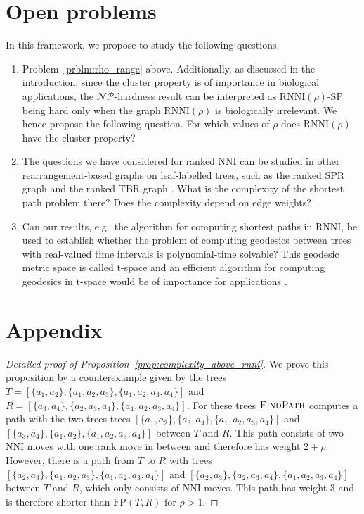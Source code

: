 \documentclass[11pt]{amsart}
\newcommand{\rnni}{\mathrm{RNNI}}
\newcommand{\findpath}{\textsc{FindPath}}
\newcommand{\nni}{\mathrm{NNI}}
\newcommand{\spr}{\mathrm{SPR}}
\newcommand{\tbr}{\mathrm{TBR}}
\newcommand{\fp}{\mathrm{FP}}
\newcommand{\np}{\mathcal{NP}}
\newcommand{\decprob}[1]{\rnni(#1)\text{-}\mathrm{SP}}
\begin{document}
\section{Open problems}

In this framework, we propose to study the following questions.
\begin{enumerate}
\item Problem~\ref{prblm:rho_range} above.
Additionally, as discussed in the introduction, since the cluster property is of importance in biological applications, the $\np$-hardness result can be interpreted as $\decprob{\rho}$ being hard only when the graph $\rnni(\rho)$ is biologically irrelevant.
We hence propose the following question.
For which values of $\rho$ does $\rnni(\rho)$ have the cluster property?


\item The questions we have considered for ranked $\nni$ can be studied in other rearrangement-based graphs on leaf-labelled trees, such as the ranked $\spr$ graph and the ranked $\tbr$ graph \autocite{Semple2003-nj}.
What is the complexity of the shortest path problem there?
Does the complexity depend on edge weights?

\item Can our results, e.g.\ the algorithm for computing shortest paths in $\rnni$, be used to establish whether the problem of computing geodesics between trees with real-valued time intervals is polynomial-time solvable?
This geodesic metric space is called $\mathrm t$-space and an efficient algorithm for computing geodesics in $\mathrm t$-space would be of importance for applications \autocite{Gavryushkin2016-uu}.
\end{enumerate}


\section*{Appendix}
\renewcommand{\figurename}{Supplementary Figure}

\begin{proof}[Detailed proof of Proposition~\ref{prop:complexity_above_rnni}]
We prove this proposition by a counterexample given by the trees \break $T = [\{a_1,a_2\},\{a_1,a_2,a_3\},\{a_1,a_2,a_3,a_4\}]$ and $R = [\{a_3,a_4\},\{a_2,a_3,a_4\},\{a_1,a_2,a_3,a_4\}]$.
For these trees $\findpath$ computes a path with the two trees trees $[\{a_1,a_2\},\{a_3,a_4\},\{a_1,a_2,a_3,a_4\}]$ and \break $[\{a_3,a_4\},\{a_1,a_2\},\{a_1,a_2,a_3,a_4\}]$ between $T$ and $R$.
This path consists of two $\nni$ moves with one rank move in between and therefore has weight $2 + \rho$.
However, there is a path from $T$ to $R$ with trees $[\{a_2,a_3\},\{a_1,a_2,a_3\},\{a_1,a_2,a_3,a_4\}]$ and $[\{a_2,a_3\},\{a_2,a_3,a_4\},\{a_1,a_2,a_3,a_4\}]$ between $T$ and $R$, which only consists of $\nni$ moves.
This path has weight $3$ and is therefore shorter than $\fp(T,R)$ for $\rho > 1$.
\end{proof}
\end{document}
